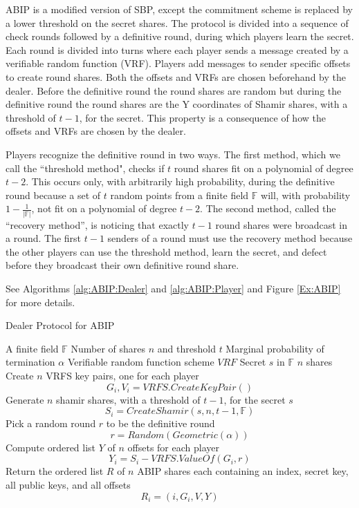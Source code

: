 \documentclass{dalcsthesis}
\begin{document}
ABIP is a modified version of SBP, except the commitment scheme is replaced by a lower threshold on the secret shares. The protocol is divided into a sequence of check rounds followed by a definitive round, during which players learn the secret. Each round is divided into turns where each player sends a message created by a verifiable random function (VRF). Players add messages to sender specific offsets to create round shares. Both the offsets and VRFs are chosen beforehand by the dealer. Before the definitive round the round shares are random but during the definitive round the round shares are the Y coordinates of Shamir shares, with a threshold of $t-1$, for the secret. This property is a consequence of how the offsets and VRFs are chosen by the dealer.

Players recognize the definitive round in two ways. The first method, which we call the ``threshold method", checks if $t$ round shares fit on a polynomial of degree $t-2$. This occurs only, with arbitrarily high probability, during the definitive round because a set of $t$ random points from a finite field $\mathbb{F}$ will, with probability $1 - \frac{1}{|\mathbb{F}|}$, not fit on a polynomial of degree $t-2$. The second method, called the ``recovery method'', is noticing that exactly $t-1$ round shares were broadcast in a round. The first $t-1$ senders of a round must use the recovery method because the other players can use the threshold method, learn the secret, and defect before they broadcast their own definitive round share.

See Algorithms \ref{alg:ABIP:Dealer} and \ref{alg:ABIP:Player} and Figure \ref{Ex:ABIP} for more details.

\begin{algorithm}
  \caption{Dealer Protocol for ABIP}
  \label{alg:ABIP:Dealer}
  \begin{algorithmic}
    \INPUT A finite field $\mathbb{F}$
    \INPUT Number of shares $n$ and threshold $t$
    \INPUT Marginal probability of termination $\alpha$
    \INPUT Verifiable random function scheme $VRF$
    \INPUT Secret $s$ in $\mathbb{F}$
    \OUTPUT $n$ shares
    \STATE Create $n$ VRFS key pairs, one for each player
    	$$G_i, V_i = VRFS.CreateKeyPair()$$
    \STATE Generate $n$ shamir shares, with a threshold of $t-1$, for the secret $s$
    	$$S_i = CreateShamir(s, n, t - 1, \mathbb{F})$$
    \STATE Pick a random round $r$ to be the definitive round
        $$r = Random(Geometric(\alpha))$$
    \STATE Compute ordered list $Y$ of $n$ offsets for each player
    	$$Y_i = S_i - VRFS.ValueOf(G_i, r)$$
    \STATE Return the ordered list $R$ of $n$ ABIP shares each containing an index, secret key, all public keys, and all offsets 
    	$$R_i = (i, G_i, V, Y)$$
  \end{algorithmic}
\end{algorithm}
\end{document}

